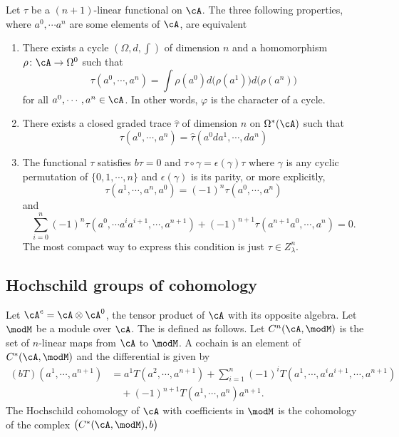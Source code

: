 \begin{proposition}
Let $\tau$ be a $(n+1)$-linear functional on $\cA$. The three following properties, where $a^0,\cdots a^n$ are some elements of $\cA$, are equivalent
\begin{enumerate}
\item There exists a cycle $(\Omega,d,\int)$ of dimension $n$ and a homomorphism $\rho\colon \cA\to \Omega^0$ such that
\[
  \tau(a^0,\cdots,a^{n})=\int \rho(a^0)d\big( \rho(a^1) \big)d\big( \rho(a^{n}) \big)
\]
for all $a^0,\cdots,a^{n}\in\cA$. In other words, $\varphi$ is the character of a cycle.
\item There exists a closed graded trace $\hat{\tau}$ of dimension $n$ on $\Omega^*(\cA)$ such that
\[
  \tau(a^0,\cdots,a^{n})=\hat{\tau}(a^0da^1,\cdots,da^{n})
\]
\item The functional $\tau$ satisfies $b\tau=0$ and $\tau\circ\gamma=\epsilon(\gamma)\tau$ where $\gamma$ is any cyclic permutation of $\{ 0,1,\cdots,n \}$ and $\epsilon(\gamma)$ is its parity, or more explicitly,
\[
	\tau(a^1,\cdots,a^{n},a^0)=(-1)^n\tau(a^0,\cdots,a^{n})
\]
and
\[
   \sum_{i=0}^{n}(-1)^n\tau(a^0,\cdots a^ia^{i+1},\cdots,a^{n+1})+(-1)^{n+1}\tau(a^{n+1}a^0,\cdots,a^{n})=0.
\]
The most compact way to express this condition is just $\tau\in Z^n_{\lambda}$.
\end{enumerate}
\end{proposition}

\subsection{Hochschild groups of cohomology}

Let $\cA^e=\cA\otimes\cA^0$, the tensor product of $\cA$ with its opposite algebra. Let $\modM$ be a module over $\cA$. The  is defined as follows. Let $C^n(\cA,\modM)$ is the set of $n$-linear maps from $\cA$ to $\modM$. A cochain is an element of $C^*(\cA,\modM)$ and the differential is given by
\begin{equation}
\begin{split}
(bT)(a^1,\cdots,a^{n+1})&=a^1T(a^2,\cdots,a^{n+1})+\sum_{i=1}^{n}(-1)^iT(a^1,\cdots,a^ia^{i+1},\cdots,a^{n+1})\\
				&\quad +(-1)^{n+1}T(a^1,\cdots,a^{n})a^{n+1}.
\end{split}
\end{equation}
The Hochschild cohomology of $\cA$ with coefficients in $\modM$ is the cohomology of the complex $\big( C^*(\cA,\modM),b \big)$

